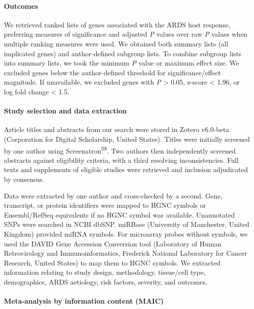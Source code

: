 \documentclass[
  11,
  a4paper,
]{article}
\let\oldparagraph\paragraph
\renewcommand{\paragraph}[1]{\oldparagraph{#1}\mbox{}}
\begin{document}
\hypertarget{outcomes}{%
\paragraph{Outcomes}\label{outcomes}}

We retrieved ranked lists of genes associated with the ARDS host
response, preferring measures of significance and adjusted \emph{P}
values over raw \emph{P} values when multiple ranking measures were
used. We obtained both summary lists (all implicated genes) and
author-defined subgroup lists. To combine subgroup lists into summary
lists, we took the minimum \emph{P} value or maximum effect size. We
excluded genes below the author-defined threshold for
significance/effect magnitude. If unavailable, we excluded genes with
\emph{P} \textgreater{} 0.05, z-score \textless{} 1.96, or log fold
change \textless{} 1.5.

\hypertarget{study-selection-and-data-extraction}{%
\paragraph{Study selection and data
extraction}\label{study-selection-and-data-extraction}}

Article titles and abstracts from our search were stored in Zotero
v6.0-beta (Corporation for Digital Scholarship, United States). Titles
were initially screened by one author using
Screenatron\textsuperscript{58}. Two authors then independently screened
abstracts against eligibility criteria, with a third resolving
inconsistencies. Full texts and supplements of eligible studies were
retrieved and inclusion adjudicated by consensus.

Data were extracted by one author and cross-checked by a second. Gene,
transcript, or protein identifiers were mapped to HGNC symbols or
Ensembl/RefSeq equivalents if no HGNC symbol was available. Unannotated
SNPs were searched in NCBI dbSNP. miRBase (University of Manchester,
United Kingdom) provided miRNA symbols. For microarray probes without
symbols, we used the DAVID Gene Accession Conversion tool (Laboratory of
Human Retrovirology and Immunoinformatics, Frederick National Laboratory
for Cancer Research, United States) to map them to HGNC symbols. We
extracted information relating to study design, methodology, tissue/cell
type, demographics, ARDS aetiology, risk factors, severity, and
outcomes.

\hypertarget{meta-analysis-by-information-content-maic-1}{%
\paragraph{Meta-analysis by information content
(MAIC)}\label{meta-analysis-by-information-content-maic-1}}
\end{document}
